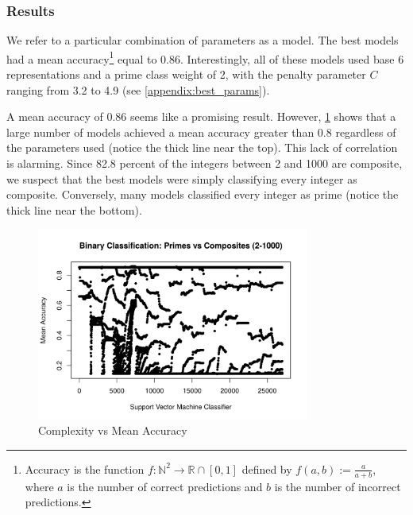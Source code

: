 \documentclass[10pt, titlepage]{amsart}
\newcommand\N{{\mathbb N}}
\newcommand\R{{\mathbb R}}
\theoremstyle{definition}
\begin{document}
	\subsubsection{Results}
	We refer to a particular combination of parameters as a model.
	The best models had a mean accuracy\footnote{Accuracy is the function $f: \N^2 \to \R \cap [0,1]$ defined by $f(a, b) := \frac{a}{a + b}$, where $a$ is the number of correct predictions and $b$ is the number of incorrect predictions.} equal to 0.86. Interestingly, all of these models used base 6 representations and a prime class weight of 2, with the penalty parameter $C$ ranging from 3.2 to 4.9 (see \cref{appendix:best_params}).
	
	A mean accuracy of 0.86 seems like a promising result. However, \cref{figure:complexity} shows that a large number of models achieved a mean accuracy greater than 0.8 regardless of the parameters used (notice the thick line near the top).
	This lack of correlation is alarming.
	Since 82.8 percent of the integers between 2 and 1000 are composite, we suspect that the best models were simply classifying every integer as composite. Conversely, many models classified every integer as prime (notice the thick line near the bottom).
	
	\begin{figure}
		\centering
			\includegraphics[width=0.8\textwidth]{complete}
		\caption{Complexity vs Mean Accuracy}
		\label{figure:complexity}
	\end{figure}

		
\end{document}
